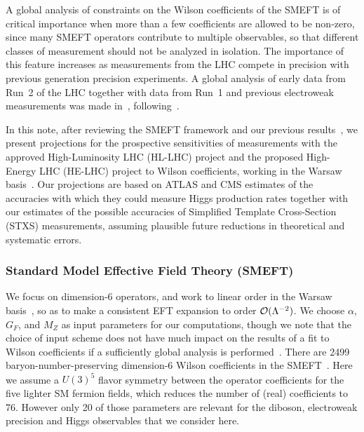 \documentclass[../report.tex]{subfiles}
\begin{document}
A global analysis of constraints on the Wilson coefficients of the SMEFT is of critical importance when more than a few coefficients are allowed to be non-zero,
since many SMEFT operators contribute to multiple observables, so that different classes of measurement should not be analyzed in isolation.
The importance of this feature increases as
measurements from the LHC compete in precision with previous generation precision experiments.
A global analysis of early data from Run~2 of the LHC together with data from Run~1 and previous electroweak measurements
was made in~\cite{Ellis:2018gqa}, following~\cite{Ellis:2014dva, Ellis:2014jta, Murphy:2017omb}.

In this note, after reviewing the SMEFT framework and our previous results~\cite{Ellis:2018gqa}, we present projections for the
prospective sensitivities of measurements with the approved High-Luminosity LHC (HL-LHC) project and the proposed High-Energy LHC (HE-LHC) project
to Wilson coefficients, working in the Warsaw basis~\cite{Grzadkowski:2010es}. 
Our projections are based on ATLAS and CMS estimates of the accuracies with which they
could measure Higgs production rates together with our estimates of the possible accuracies of Simplified Template Cross-Section (STXS)
measurements, assuming plausible future reductions in theoretical and systematic errors.

\subsubsection{Standard Model Effective Field Theory (SMEFT)}
\label{sec8:smeft}
We focus on dimension-6 operators, and work to linear order in the Warsaw basis~\cite{Grzadkowski:2010es},
so as to make a consistent EFT expansion to order ${\cal O}(\Lambda^{-2})$. 
We choose $\alpha$, $G_F$, and $M_Z$ as input parameters for our computations, though we note that
the choice of input scheme does not have much impact on the results of a fit to Wilson coefficients if a sufficiently global analysis is performed~\cite{Brivio:2017bnu}.
There are 2499 baryon-number-preserving dimension-6 Wilson coefficients in the SMEFT~\cite{Alonso:2013hga}.
Here we assume a $U(3)^5$ flavor symmetry between the operator coefficients for the five lighter SM fermion fields,
which reduces the number of (real) coefficients to 76.
However only 20 of those parameters are relevant for the diboson, electroweak precision and Higgs observables that we consider here.
\end{document}
